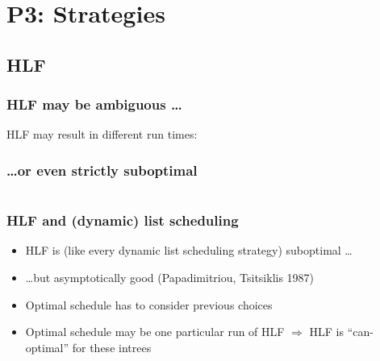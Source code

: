 \documentclass{beamer}
\newcommand{\todo}[1]{ {\color{red}{#1} }}
\begin{document}
\section{P3: Strategies}

\subsection{HLF}

\begin{frame}
  \frametitle{HLF may be ambiguous \dots}
  HLF may result in different run times:
  \begin{block}{}
    
  \end{block}
\end{frame}

\begin{frame}
  \frametitle{\dots or even strictly suboptimal}
  \begin{columns}[ht]
    \begin{column}{.45\textwidth}
      \centering
      
    \end{column}
    \begin{column}{.45\textwidth}
      \centering
      
    \end{column}
  \end{columns}
\end{frame}

\begin{frame}
  \frametitle{HLF and (dynamic) list scheduling}
  \begin{itemize}
  \item HLF is (like every dynamic list scheduling strategy) suboptimal \dots
  \item \dots but asymptotically good (Papadimitriou, Tsitsiklis 1987)
  \item Optimal schedule has to consider previous choices
  \item Optimal schedule may be one particular run of HLF
    $\Rightarrow$ HLF is ``can-optimal'' for these intrees
  \end{itemize}
\end{frame}
\end{document}
